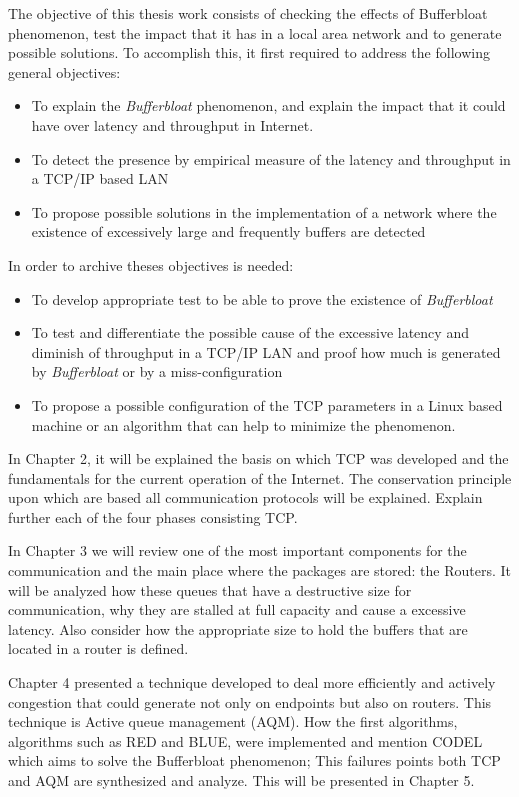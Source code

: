 The objective of this thesis work consists of checking the effects of
Bufferbloat phenomenon, test the impact that it has in a local area network
and to generate possible solutions. To accomplish this, it first required to
address the following general objectives:

\begin{itemize}
	\item To explain the \textit{Bufferbloat} phenomenon, and explain the impact that it could have over latency and throughput in Internet.
	\item To detect the presence by empirical measure of the latency and throughput in a TCP/IP based LAN
	\item To propose possible solutions in the implementation of a network where the existence of excessively large and frequently buffers are detected
\end{itemize}

In order to archive theses objectives is needed:

\begin{itemize}
\item To develop appropriate test to be able to prove the existence of \textit{Bufferbloat}
\item To test and differentiate the possible cause of the excessive latency and diminish of throughput in a TCP/IP LAN and proof how much is generated by \textit{Bufferbloat} or by a miss-configuration
\item To propose a possible configuration of the TCP parameters in a Linux based machine or an algorithm that can help to minimize the phenomenon.
\end{itemize}

In Chapter 2, it will be explained the basis on which TCP was developed and
the fundamentals for the current operation of the Internet. The conservation
principle upon which are based all communication protocols will be explained.
Explain further each of the four phases consisting TCP.

In Chapter 3 we will review one of the most important components for the
communication and the main place where the packages are stored: the Routers.
It will be analyzed how these queues that have a destructive size for
communication, why they are stalled at full capacity and cause a excessive
latency. Also consider how the appropriate size to hold the buffers that are
located in a router is defined.

Chapter 4 presented a technique developed to deal more efficiently and
actively congestion that could generate not only on endpoints but also on
routers. This technique is Active queue management (AQM). How the first
algorithms, algorithms such as RED and BLUE, were implemented and mention
CODEL which aims to solve the Bufferbloat phenomenon; This failures points
both TCP and AQM are synthesized and analyze. This will be presented in
Chapter 5.

